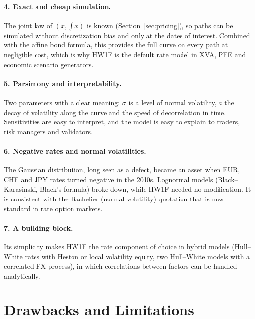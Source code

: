 \documentclass[11pt,a4paper]{article}
\theoremstyle{plain}
\theoremstyle{definition}
\begin{document}
\paragraph{4. Exact and cheap simulation.} The joint law of $(x,\int x)$ is known (Section~\ref{sec:pricing}), so paths can be simulated without discretization bias and only at the dates of interest. Combined with the affine bond formula, this provides the full curve on every path at negligible cost, which is why HW1F is the default rate model in XVA, PFE and economic scenario generators.

\paragraph{5. Parsimony and interpretability.} Two parameters with a clear meaning: $\sigma$ is a level of normal volatility, $a$ the decay of volatility along the curve and the speed of decorrelation in time. Sensitivities are easy to interpret, and the model is easy to explain to traders, risk managers and validators.

\paragraph{6. Negative rates and normal volatilities.} The Gaussian distribution, long seen as a defect, became an asset when EUR, CHF and JPY rates turned negative in the 2010s. Lognormal models (Black--Karasinski, Black's formula) broke down, while HW1F needed no modification. It is consistent with the Bachelier (normal volatility) quotation that is now standard in rate option markets.

\paragraph{7. A building block.} Its simplicity makes HW1F the rate component of choice in hybrid models (Hull--White rates with Heston or local volatility equity, two Hull--White models with a correlated FX process), in which correlations between factors can be handled analytically.

\clearpage
\section{Drawbacks and Limitations}
\label{sec:drawbacks}
\end{document}
